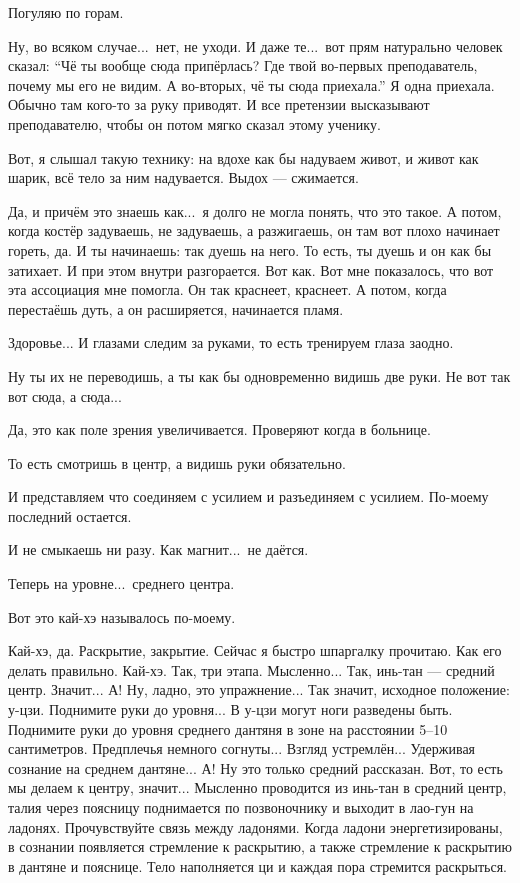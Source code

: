 \I
Погуляю по горам.

\M
Ну, во всяком случае...\ нет, не уходи. И даже те...\ вот прям натурально человек
сказал: ``Чё ты вообще сюда припёрлась? Где твой во-первых преподаватель,
почему мы его не видим. А во-вторых, чё ты сюда приехала.''
Я одна приехала.
Обычно там кого-то за руку приводят. И все претензии высказывают преподавателю,
чтобы он потом мягко сказал этому ученику.

\I
Вот, я слышал такую технику: на вдохе как бы надуваем живот, и живот как шарик,
всё тело за ним надувается. Выдох --- сжимается.

\M
Да, и причём это знаешь как...\ я долго не могла понять, что это такое. А
потом, когда костёр задуваешь, не задуваешь, а разжигаешь, он там вот плохо начинает гореть, да.
И ты начинаешь: так дуешь на него.
То есть, ты дуешь и он как бы затихает.
И при этом внутри разгорается. Вот как. Вот мне показалось, что вот эта ассоциация мне помогла.
Он так краснеет, краснеет.
А потом, когда перестаёшь дуть, а он расширяется, начинается пламя.

\I
Здоровье...
И глазами следим за руками, то есть тренируем глаза заодно.

\M
Ну ты их не переводишь, а ты как бы одновременно видишь две руки. Не вот так вот сюда,
а сюда...

\I
Да, это как поле зрения увеличивается.
Проверяют когда в больнице.

\M
То есть
смотришь в центр, а видишь руки обязательно.

\I
И представляем что соединяем с усилием и разъединяем с усилием.
По-моему последний остается.

\M
И не смыкаешь ни разу. Как магнит...\ не даётся.

\I
Теперь на уровне...\ среднего центра.

\M
Вот это кай-хэ называлось по-моему.

\I
Кай-хэ, да.
Раскрытие, закрытие. Сейчас я быстро шпаргалку прочитаю. Как
его делать правильно. Кай-хэ. Так, три этапа.
Мысленно... Так, инь-тан --- средний центр. Значит...
А! Ну, ладно, это упражнение... Так значит, исходное положение: у-цзи.
Поднимите руки до уровня... В у-цзи могут ноги разведены быть. Поднимите
руки до уровня среднего дантяня в зоне на расстоянии 5--10
сантиметров. Предплечья немного согнуты... Взгляд устремлён...
Удерживая сознание на среднем дантяне... А! Ну это только средний рассказан. Вот,
то есть мы делаем к центру, значит... Мысленно проводится из инь-тан в средний центр,
талия через поясницу поднимается по позвоночнику и выходит в лао-гун на ладонях.
Прочувствуйте связь между ладонями. Когда ладони энергетизированы, в сознании появляется
стремление к раскрытию, а также стремление к раскрытию в дантяне и пояснице.
Тело наполняется ци и каждая пора стремится раскрыться.

